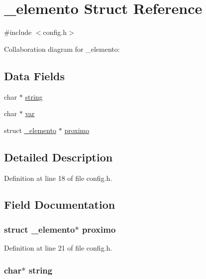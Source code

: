\hypertarget{struct__elemento}{\section{\-\_\-elemento Struct Reference}
\label{struct__elemento}
}


{\ttfamily \#include $<$config.\-h$>$}



Collaboration diagram for \-\_\-elemento\-:
\subsection*{Data Fields}
\begin{DoxyCompactItemize}
\item 
char $\ast$ \hyperlink{struct__elemento_aed1cfb225a5fb77461e7972691e68a72}{string}
\item 
char $\ast$ \hyperlink{struct__elemento_a7ab41949c7fcaab36a79a7418f4b6f62}{var}
\item 
struct \hyperlink{struct__elemento}{\-\_\-elemento} $\ast$ \hyperlink{struct__elemento_a5d1a431a1a375076d7e785ac1c3dffab}{proximo}
\end{DoxyCompactItemize}


\subsection{Detailed Description}


Definition at line 18 of file config.\-h.



\subsection{Field Documentation}
\hypertarget{struct__elemento_a5d1a431a1a375076d7e785ac1c3dffab}{
\subsubsection[{proximo}]{\setlength{\rightskip}{0pt plus 5cm}struct {\bf \-\_\-elemento}$\ast$ proximo}}\label{struct__elemento_a5d1a431a1a375076d7e785ac1c3dffab}


Definition at line 21 of file config.\-h.

\hypertarget{struct__elemento_aed1cfb225a5fb77461e7972691e68a72}{
\subsubsection[{string}]{\setlength{\rightskip}{0pt plus 5cm}char$\ast$ string}}\label{struct__elemento_aed1cfb225a5fb77461e7972691e68a72}


